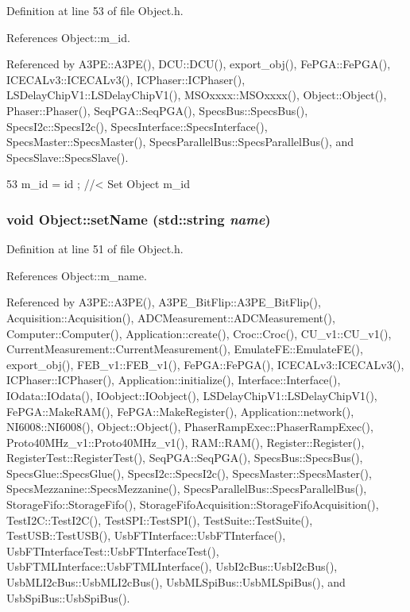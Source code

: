 Definition at line 53 of file Object.h.

References Object::m\_\-id.

Referenced by A3PE::A3PE(), DCU::DCU(), export\_\-obj(), FePGA::FePGA(), ICECALv3::ICECALv3(), ICPhaser::ICPhaser(), LSDelayChipV1::LSDelayChipV1(), MSOxxxx::MSOxxxx(), Object::Object(), Phaser::Phaser(), SeqPGA::SeqPGA(), SpecsBus::SpecsBus(), SpecsI2c::SpecsI2c(), SpecsInterface::SpecsInterface(), SpecsMaster::SpecsMaster(), SpecsParallelBus::SpecsParallelBus(), and SpecsSlave::SpecsSlave().


\begin{DoxyCode}
53 { m_id    = id    ; } //< Set Object m_id
\end{DoxyCode}
\hypertarget{classObject_ae30fea75683c2d149b6b6d17c09ecd0c}{
\subsubsection[{setName}]{\setlength{\rightskip}{0pt plus 5cm}void Object::setName (std::string {\em name})}}
\label{classObject_ae30fea75683c2d149b6b6d17c09ecd0c}


Definition at line 51 of file Object.h.

References Object::m\_\-name.

Referenced by A3PE::A3PE(), A3PE\_\-BitFlip::A3PE\_\-BitFlip(), Acquisition::Acquisition(), ADCMeasurement::ADCMeasurement(), Computer::Computer(), Application::create(), Croc::Croc(), CU\_\-v1::CU\_\-v1(), CurrentMeasurement::CurrentMeasurement(), EmulateFE::EmulateFE(), export\_\-obj(), FEB\_\-v1::FEB\_\-v1(), FePGA::FePGA(), ICECALv3::ICECALv3(), ICPhaser::ICPhaser(), Application::initialize(), Interface::Interface(), IOdata::IOdata(), IOobject::IOobject(), LSDelayChipV1::LSDelayChipV1(), FePGA::MakeRAM(), FePGA::MakeRegister(), Application::network(), NI6008::NI6008(), Object::Object(), PhaserRampExec::PhaserRampExec(), Proto40MHz\_\-v1::Proto40MHz\_\-v1(), RAM::RAM(), Register::Register(), RegisterTest::RegisterTest(), SeqPGA::SeqPGA(), SpecsBus::SpecsBus(), SpecsGlue::SpecsGlue(), SpecsI2c::SpecsI2c(), SpecsMaster::SpecsMaster(), SpecsMezzanine::SpecsMezzanine(), SpecsParallelBus::SpecsParallelBus(), StorageFifo::StorageFifo(), StorageFifoAcquisition::StorageFifoAcquisition(), TestI2C::TestI2C(), TestSPI::TestSPI(), TestSuite::TestSuite(), TestUSB::TestUSB(), UsbFTInterface::UsbFTInterface(), UsbFTInterfaceTest::UsbFTInterfaceTest(), UsbFTMLInterface::UsbFTMLInterface(), UsbI2cBus::UsbI2cBus(), UsbMLI2cBus::UsbMLI2cBus(), UsbMLSpiBus::UsbMLSpiBus(), and UsbSpiBus::UsbSpiBus().


